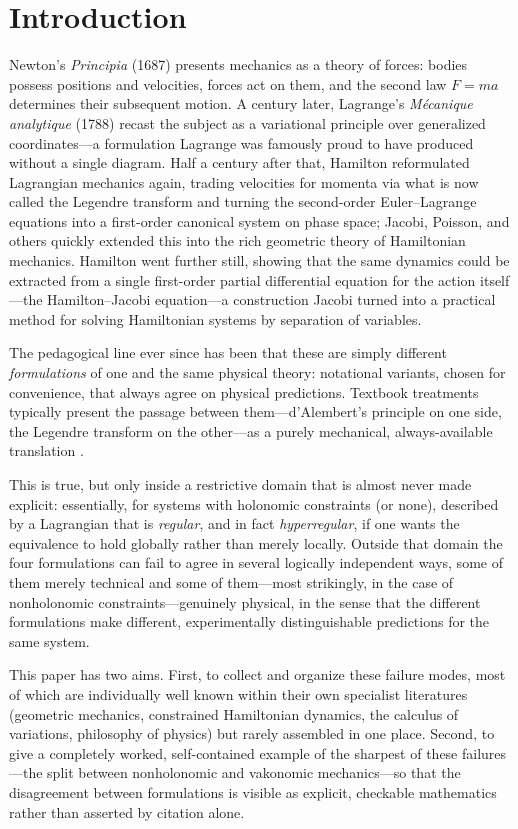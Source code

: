 \documentclass[11pt]{article}
\begin{document}
\section{Introduction}

Newton's \emph{Principia} (1687) presents mechanics as a theory of forces: bodies possess positions and velocities, forces act on them, and the second law $F = ma$ determines their subsequent motion. A century later, Lagrange's \emph{M\'ecanique analytique} (1788) recast the subject as a variational principle over generalized coordinates---a formulation Lagrange was famously proud to have produced without a single diagram. Half a century after that, Hamilton reformulated Lagrangian mechanics again, trading velocities for momenta via what is now called the Legendre transform and turning the second-order Euler--Lagrange equations into a first-order canonical system on phase space; Jacobi, Poisson, and others quickly extended this into the rich geometric theory of Hamiltonian mechanics. Hamilton went further still, showing that the same dynamics could be extracted from a single first-order partial differential equation for the action itself---the Hamilton--Jacobi equation---a construction Jacobi turned into a practical method for solving Hamiltonian systems by separation of variables.

The pedagogical line ever since has been that these are simply different \emph{formulations} of one and the same physical theory: notational variants, chosen for convenience, that always agree on physical predictions. Textbook treatments typically present the passage between them---d'Alembert's principle on one side, the Legendre transform on the other---as a purely mechanical, always-available translation \citep{goldstein2001,arnold1989}.

This is true, but only inside a restrictive domain that is almost never made explicit: essentially, for systems with holonomic constraints (or none), described by a Lagrangian that is \emph{regular}, and in fact \emph{hyperregular}, if one wants the equivalence to hold globally rather than merely locally. Outside that domain the four formulations can fail to agree in several logically independent ways, some of them merely technical and some of them---most strikingly, in the case of nonholonomic constraints---genuinely physical, in the sense that the different formulations make different, experimentally distinguishable predictions for the same system.

This paper has two aims. First, to collect and organize these failure modes, most of which are individually well known within their own specialist literatures (geometric mechanics, constrained Hamiltonian dynamics, the calculus of variations, philosophy of physics) but rarely assembled in one place. Second, to give a completely worked, self-contained example of the sharpest of these failures---the split between nonholonomic and vakonomic mechanics---so that the disagreement between formulations is visible as explicit, checkable mathematics rather than asserted by citation alone.
\end{document}
